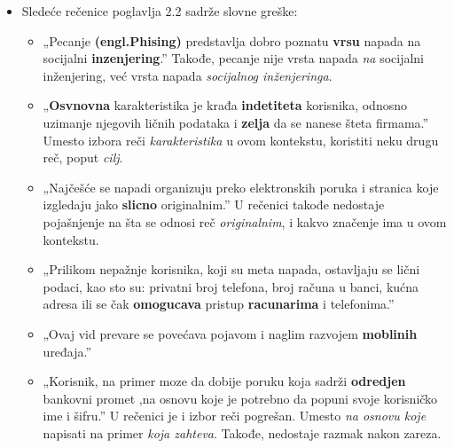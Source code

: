 \documentclass[a4paper]{report}
\begin{document}
\begin{itemize}
    \item Sledeće rečenice poglavlja 2.2 sadrže slovne greške:
    \begin{itemize}
        \item „Pecanje \textbf{(engl.Phising)} predstavlja dobro poznatu \textbf{vrsu} napada na socijalni \textbf{inzenjering}.”\newline
Takođe, pecanje nije vrsta napada \textit{na} socijalni inženjering, već vrsta napada \textit{socijalnog inženjeringa}.
    \end{itemize}
    \begin{itemize}
    \item „\textbf{Osvnovna} karakteristika je krađa \textbf{indetiteta} korisnika, odnosno uzimanje njegovih ličnih podataka i \textbf{zelja} da se nanese šteta firmama.”
Umesto izbora reči \textit{karakteristika} u ovom kontekstu, koristiti neku drugu reč, poput \textit{cilj}. 
    \end{itemize}
    \begin{itemize}
        \item  „Najčešće se napadi organizuju preko elektronskih poruka i stranica koje izgledaju jako \textbf{slicno} originalnim.”\newline
        U rečenici takođe nedostaje pojašnjenje na šta se odnosi reč  \textit{originalnim}, i kakvo značenje ima u ovom kontekstu.
    \end{itemize}
    \begin{itemize}
        \item „Prilikom nepažnje korisnika, koji su meta
napada, ostavljaju se lični podaci, kao sto su: privatni broj telefona, broj računa u banci, kućna adresa ili se čak \textbf{omogucava} pristup \textbf{racunarima} i telefonima.”
    \end{itemize}
    \begin{itemize}
        \item „Ovaj vid prevare se povećava pojavom i naglim razvojem \textbf{moblinih} uređaja.”
    \end{itemize}
    \begin{itemize}
        \item „Korisnik, na primer moze da dobije poruku koja sadrži \textbf{odredjen} bankovni promet ,na osnovu koje je potrebno da popuni svoje korisničko ime i šifru.”\newline
        U rečenici je i izbor reči pogrešan. Umesto  \textit{na osnovu koje} napisati na primer \textit{koja zahteva}. Takođe, nedostaje razmak nakon zareza.

\end{itemize}
\end{itemize}
\end{document}
